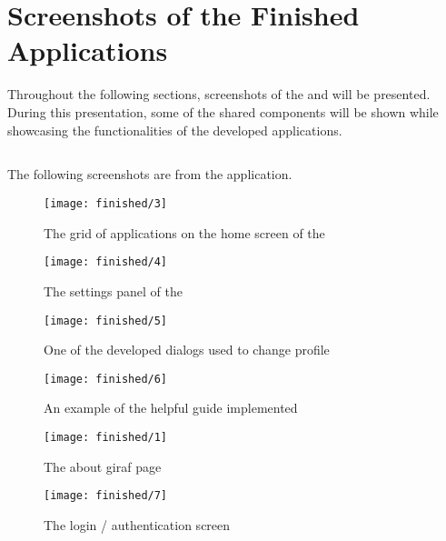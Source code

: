
\chapter{Screenshots of the Finished Applications}
\label{app:screenshots_of_the_finished_applications}

Throughout the following sections, screenshots of the \launcher and \ct will be presented. During this presentation, some of the shared components will be shown while showcasing the functionalities of the developed applications.

\section{\launcher}
\label{sec:screenshot_of_launcher}
The following screenshots are from the \launcher application.

\begin{figure}[!htbp]
	\centering
	\texttt{[image: finished/3]}
	\caption{The grid of applications on the home screen of the \launcher}
\end{figure}
\FloatBarrier

\begin{figure}[!htbp]
	\centering
	\texttt{[image: finished/4]}
	\caption{The settings panel of the \launcher}
\end{figure}
\FloatBarrier

\begin{figure}[!htbp]
	\centering
	\texttt{[image: finished/5]}
	\caption{One of the developed dialogs used to change profile}
\end{figure}
\FloatBarrier

\begin{figure}[!htbp]
	\centering
	\texttt{[image: finished/6]}
	\caption{An example of the helpful guide implemented}
\end{figure}
\FloatBarrier

\begin{figure}[!htbp]
	\centering
	\texttt{[image: finished/1]}
	\caption{The about giraf page}
\end{figure}
\FloatBarrier

\begin{figure}[!htbp]
	\centering
	\texttt{[image: finished/7]}
	\caption{The login / authentication screen}
\end{figure}
\FloatBarrier

